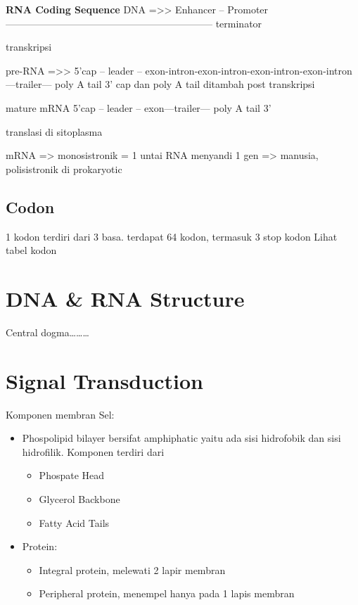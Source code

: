 \documentclass[
  letterpaper,
  DIV=11,
  numbers=noendperiod]{scrreprt}
\providecommand{\tightlist}{%
  \setlength{\itemsep}{0pt}\setlength{\parskip}{0pt}}\usepackage{longtable,booktabs,array}
\begin{document}
\textbf{RNA Coding Sequence} DNA =\textgreater\textgreater{} Enhancer --
Promoter ---------------------------------------------------------------
terminator

transkripsi

pre-RNA =\textgreater\textgreater{} 5'cap -- leader --
exon-intron-exon-intron-exon-intron-exon-intron---trailer--- poly A tail
3' cap dan poly A tail ditambah post transkripsi

mature mRNA 5'cap -- leader -- exon---trailer--- poly A tail 3'

translasi di sitoplasma

mRNA =\textgreater{} monosistronik = 1 untai RNA menyandi 1 gen
=\textgreater{} manusia, polisistronik di prokaryotic

\subsection{Codon}\label{codon}

1 kodon terdiri dari 3 basa. terdapat 64 kodon, termasuk 3 stop kodon
Lihat tabel kodon

\section{DNA \& RNA Structure}\label{dna-rna-structure}

Central dogma\ldots\ldots\ldots{}

\section{Signal Transduction}\label{signal-transduction}

Komponen membran Sel:

\begin{itemize}
\tightlist
\item
  Phospolipid bilayer bersifat amphiphatic yaitu ada sisi hidrofobik dan
  sisi hidrofilik. Komponen terdiri dari

  \begin{itemize}
  \tightlist
  \item
    Phospate Head
  \item
    Glycerol Backbone
  \item
    Fatty Acid Tails
  \end{itemize}
\item
  Protein:

  \begin{itemize}
  \tightlist
  \item
    Integral protein, melewati 2 lapir membran
  \item
    Peripheral protein, menempel hanya pada 1 lapis membran
  \end{itemize}
\end{itemize}
\end{document}
